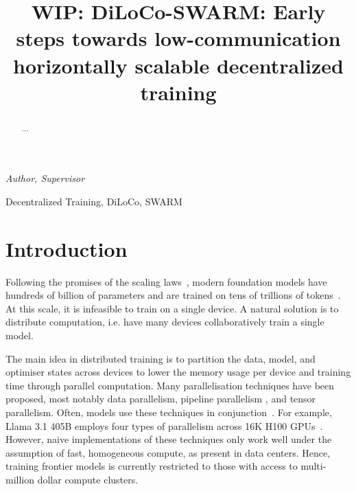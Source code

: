 \documentclass[conference, 10pt]{IEEEtran}
\begin{document}
\title{
  {\LARGE WIP: DiLoCo-SWARM: Early steps towards low-communication horizontally scalable decentralized training}
}

\author{
  \and
  \and
  \and
}

\maketitle

{\small\itshape {} Author,  Supervisor}

\begin{abstract} 
  ...
\end{abstract}

\begin{IEEEkeywords}
Decentralized Training, DiLoCo, SWARM
\end{IEEEkeywords}

\section{Introduction} 

Following the promises of the scaling laws~\cite{kaplan2020,hoffmann2022},
modern foundation models have hundreds of billion of parameters and are trained
on tens of trillions of
tokens~\cite{brown2023,touvron2023,dubey2024,openai2024,chowdhery2022,geminiteam2024}.
At this scale, it is infeasible to train on a single device. A natural solution
is to distribute computation, i.e. have many devices collaboratively train a
single model.

The main idea in distributed training is to partition the data, model, and
optimiser states across devices to lower the memory usage per device and
training time through parallel computation. Many parallelisation techniques have
been proposed, most notably data parallelism, pipeline parallelism , and tensor
parallelism. Often, models use these techniques in conjunction~\cite{dubey2024,
shoeybi2020}. For example, Llama 3.1 405B employs four types of parallelism
across 16K H100 GPUs~\cite{dubey2024}. However, naive implementations of these
techniques only work well under the assumption of fast, homogeneous compute, as
present in data centers. Hence, training frontier models is currently restricted
to those with access to multi-million dollar compute clusters. 
\end{document}
